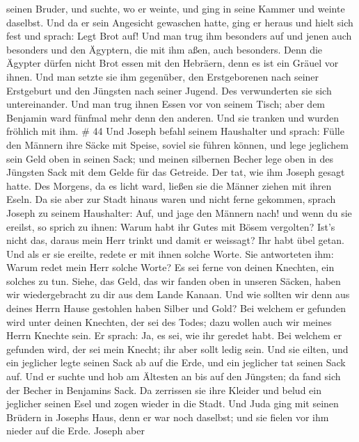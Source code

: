 seinen Bruder, und suchte, wo er weinte, und ging in seine Kammer und
weinte daselbst.  Und da er sein Angesicht gewaschen hatte,
ging er heraus und hielt sich fest und sprach: Legt Brot auf!
 Und man trug ihm besonders auf und jenen auch besonders
und den Ägyptern, die mit ihm aßen, auch besonders. Denn die Ägypter
dürfen nicht Brot essen mit den Hebräern, denn es ist ein Gräuel vor
ihnen.  Und man setzte sie ihm gegenüber, den Erstgeborenen
nach seiner Erstgeburt und den Jüngsten nach seiner Jugend. Des
verwunderten sie sich untereinander.  Und man trug ihnen
Essen vor von seinem Tisch; aber dem Benjamin ward fünfmal mehr denn den
anderen. Und sie tranken und wurden fröhlich mit ihm. \# 44 
Und Joseph befahl seinem Haushalter und sprach: Fülle den Männern ihre
Säcke mit Speise, soviel sie führen können, und lege jeglichem sein Geld
oben in seinen Sack;  und meinen silbernen Becher lege oben
in des Jüngsten Sack mit dem Gelde für das Getreide. Der tat, wie ihm
Joseph gesagt hatte.  Des Morgens, da es licht ward, ließen
sie die Männer ziehen mit ihren Eseln.  Da sie aber zur
Stadt hinaus waren und nicht ferne gekommen, sprach Joseph zu seinem
Haushalter: Auf, und jage den Männern nach! und wenn du sie ereilst, so
sprich zu ihnen: Warum habt ihr Gutes mit Bösem vergolten? 
Ist's nicht das, daraus mein Herr trinkt und damit er weissagt? Ihr habt
übel getan.  Und als er sie ereilte, redete er mit ihnen
solche Worte.  Sie antworteten ihm: Warum redet mein Herr
solche Worte? Es sei ferne von deinen Knechten, ein solches zu tun.
 Siehe, das Geld, das wir fanden oben in unseren Säcken,
haben wir wiedergebracht zu dir aus dem Lande Kanaan. Und wie sollten
wir denn aus deines Herrn Hause gestohlen haben Silber und Gold?
 Bei welchem er gefunden wird unter deinen Knechten, der sei
des Todes; dazu wollen auch wir meines Herrn Knechte sein. 
Er sprach: Ja, es sei, wie ihr geredet habt. Bei welchem er gefunden
wird, der sei mein Knecht; ihr aber sollt ledig sein.  Und
sie eilten, und ein jeglicher legte seinen Sack ab auf die Erde, und ein
jeglicher tat seinen Sack auf.  Und er suchte und hob am
Ältesten an bis auf den Jüngsten; da fand sich der Becher in Benjamins
Sack.  Da zerrissen sie ihre Kleider und belud ein
jeglicher seinen Esel und zogen wieder in die Stadt.  Und
Juda ging mit seinen Brüdern in Josephs Haus, denn er war noch daselbst;
und sie fielen vor ihm nieder auf die Erde.  Joseph aber
